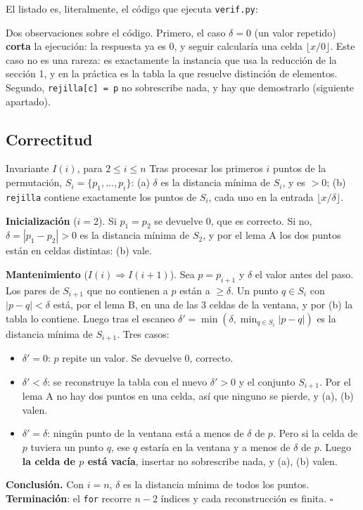 \documentclass[11pt]{article}
\begin{document}
El listado es, literalmente, el código que ejecuta \texttt{verif.py}:



Dos observaciones sobre el código. Primero, el caso $\delta=0$ (un valor repetido) \textbf{corta} la
ejecución: la respuesta ya es $0$, y seguir calcularía una celda $\lfloor x/0\rfloor$. Este caso no es
una rareza: es exactamente la instancia que usa la reducción de la sección 1, y en la práctica es la tabla
la que resuelve distinción de elementos. Segundo, \texttt{rejilla[c] = p} no sobrescribe nada, y hay que
demostrarlo (siguiente apartado).

\subsection{Correctitud}

\begin{resultado}{Invariante $I(i)$, para $2\le i\le n$}
Tras procesar los primeros $i$ puntos de la permutación, $S_i=\{p_1,\dots,p_i\}$: (a) $\delta$ es la
distancia mínima de $S_i$, y es $>0$; (b) \texttt{rejilla} contiene exactamente los puntos de $S_i$, cada uno
en la entrada $\lfloor x/\delta\rfloor$.
\end{resultado}

\textbf{Inicialización} ($i=2$). Si $p_1=p_2$ se devuelve $0$, que es correcto. Si no, $\delta=|p_1-p_2|>0$
es la distancia mínima de $S_2$, y por el lema A los dos puntos están en celdas distintas: (b) vale.

\textbf{Mantenimiento} ($I(i)\Rightarrow I(i{+}1)$). Sea $p=p_{i+1}$ y $\delta$ el valor antes del paso. Los
pares de $S_{i+1}$ que no contienen a $p$ están a $\ge\delta$. Un punto $q\in S_i$ con $|p-q|<\delta$ está,
por el lema B, en una de las 3 celdas de la ventana, y por (b) la tabla lo contiene. Luego tras el
escaneo $\delta'=\min(\delta,\min_{q\in S_i}|p-q|)$ es la distancia mínima de $S_{i+1}$. Tres casos:
\begin{itemize}[leftmargin=14pt]
\item $\delta'=0$: $p$ repite un valor. Se devuelve $0$, correcto.
\item $\delta'<\delta$: se reconstruye la tabla con el nuevo $\delta'>0$ y el conjunto $S_{i+1}$. Por el lema
A no hay dos puntos en una celda, así que ninguno se pierde, y (a), (b) valen.
\item $\delta'=\delta$: ningún punto de la ventana está a menos de $\delta$ de $p$. Pero si la celda de $p$
tuviera un punto $q$, ese $q$ estaría en la ventana y a menos de $\delta$ de $p$. Luego \textbf{la celda de
$p$ está vacía}, insertar no sobrescribe nada, y (a), (b) valen.
\end{itemize}
\textbf{Conclusión.} Con $i=n$, $\delta$ es la distancia mínima de todos los puntos. \textbf{Terminación}:
el \texttt{for} recorre $n-2$ índices y cada reconstrucción es finita. \hfill$\square$
\end{document}
